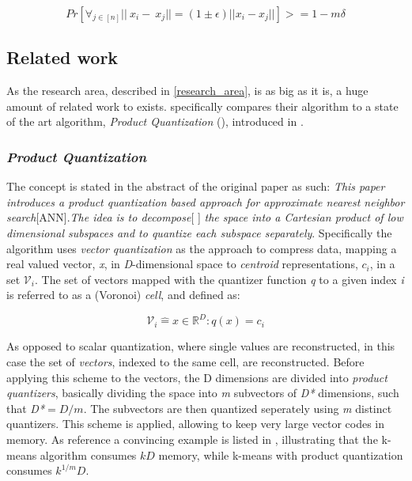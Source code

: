 \begin{equation}
Pr[\forall{}_{j\in{}[n]} ||~x_i-~x_j||= (1\pm\epsilon)||x_i-x_j||] >= 1 - m\delta
\end{equation}

\subsection{Related work}
\label{state_of_the_art}
As the research area, described in \ref{research_area}, is as big as it is, a huge amount of related work to \qs{} exists. \cite{wagner17} specifically compares their algorithm to a state of the art algorithm, \textit{Product Quantization} (\pq{}), introduced in \cite{schmid9}. %

\subsubsection{\textit{Product Quantization}}
The \pq{} concept is stated in the abstract of the original paper as such: \textit{This paper introduces a product quantization based approach for approximate nearest neighbor search}[ANN].\textit{The idea is to decompose}[ ] \textit{the space into a Cartesian product of low dimensional subspaces and to quantize each subspace separately}. Specifically the algorithm uses \textit{vector quantization} as the approach to compress data, mapping a real valued vector, \textit{x}, in \textit{D}-dimensional space to \textit{centroid} representations, \textit{$c_i$}, in a set $\mathcal{V}_i$\cite[p.3 II-A]{schmid9}. The set of vectors mapped with the quantizer function \textit{q} to a given index \textit{i} is referred to as a (Voronoi) \textit{cell}, and defined as:

\begin{equation}
	\mathcal{V}_i\mathrel{\hat=}{x\in\mathbb{R}^D : q(x)=c_i}
\end{equation}

As opposed to scalar quantization, where single values are reconstructed, in this case the set of \textit{vectors}, indexed to the same cell, are reconstructed. Before applying this scheme to the vectors, the D dimensions are divided into \textit{product quantizers}, basically dividing the space into \textit{m} subvectors of \textit{D*} dimensions, such that \textit{D*$=D/m$}\cite[p.3 II-B]{schmid9}. The subvectors are then quantized seperately using \textit{m} distinct quantizers. This scheme is applied, allowing to keep very large vector codes in memory. As reference a convincing example is listed in \cite[Table I, p. 4]{schmid9}, illustrating that the k-means algorithm consumes $kD$ memory, while k-means with product quantization consumes  $k^{1/m}D$.


